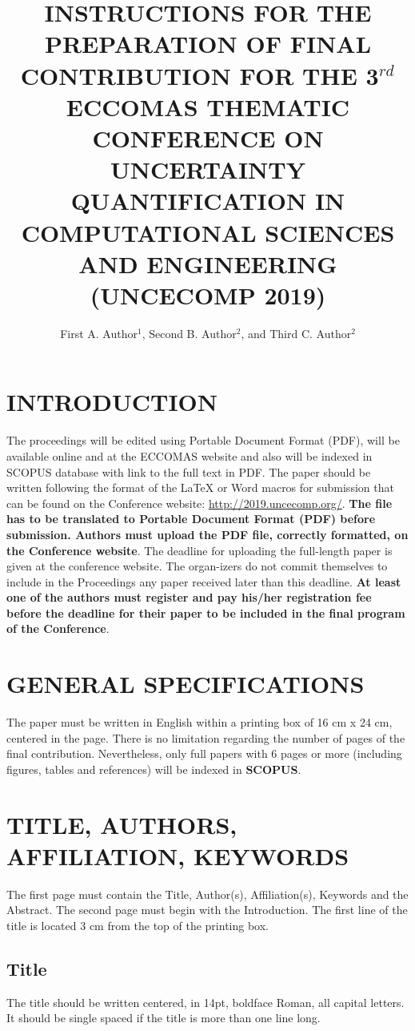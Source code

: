 \documentclass{uncecomp2019}
\title{INSTRUCTIONS FOR THE PREPARATION OF FINAL CONTRIBUTION FOR THE 3$^{rd}$
ECCOMAS THEMATIC CONFERENCE ON UNCERTAINTY QUANTIFICATION IN COMPUTATIONAL
SCIENCES AND ENGINEERING (UNCECOMP 2019)}
\author{First A. Author$^1$, Second B. Author$^2$, and Third C. Author$^2$}
\begin{document}
\section{INTRODUCTION}

The proceedings will be edited using Portable Document Format (PDF),
will be available online and at the ECCOMAS website and also will be 
indexed in SCOPUS database with link to the full text in PDF. 
The paper should be written following the format of the LaTeX or Word macros 
for submission that can be found on the Conference website: 
\url{http://2019.uncecomp.org/}. 
\textbf{The file has to be translated to Portable Document Format (PDF) before 
submission. Authors must upload the PDF file, correctly formatted, on the 
Conference website}.
The deadline for uploading the full-length paper is given at the conference 
website. The organ-izers do not commit themselves to include in the 
Proceedings any paper received later than this deadline. \textbf{At least 
one of the authors must register and pay his/her registration fee before 
the deadline for their paper to be included in the final program of the 
Conference}.

\section{GENERAL SPECIFICATIONS}

The paper must be written in English within a printing box of 16 cm x 24 cm,
centered in the page. There is no limitation regarding the number of pages of
the final contribution. Nevertheless, only full papers with 6 pages or more
(including figures, tables and references) will be indexed in \textbf{SCOPUS}.

\section{TITLE, AUTHORS, AFFILIATION, KEYWORDS}

The first page must contain the Title, Author(s), Affiliation(s), Keywords
and the Abstract. The second page must begin with the Introduction. The first
line of the title is located 3 cm from the top of the printing box.

\subsection{Title}

The title should be written centered, in 14pt, boldface Roman, all capital
letters. It should be single spaced if the title is more than one line long.
\end{document}

